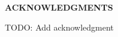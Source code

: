 \documentclass[../Main.tex]{subfiles}
\begin{document}
	\begin{center}
		\Large{\textbf{ACKNOWLEDGMENTS}}\\
	\end{center}
	\vspace{1cm}
	TODO: Add acknowledgment
\end{document}
